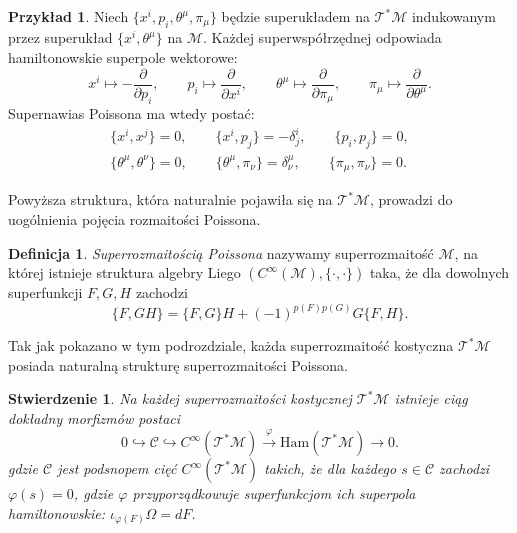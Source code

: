 \documentclass[11pt,a4paper]{report}
\newtheorem{proposition}[theorem]{Stwierdzenie}
\theoremstyle{definition}
\newtheorem{example}[theorem]{Przykład}
\newtheorem{definition}[theorem]{Definicja}
\begin{document}
\begin{example}
 Niech $\{ x^i, p_i, \theta^\mu, \pi_\mu \}$ będzie superukładem na $\mathcal{T^*M}$ indukowanym przez superukład $\{ x^i, \theta^\mu \}$ na $\mathcal{M}$. Każdej superwspółrzędnej odpowiada hamiltonowskie superpole wektorowe:
 \begin{equation*}
   x^i \mapsto -\frac{\partial}{\partial p_i}, \qquad p_i \mapsto \frac{\partial}{\partial x^i}, \qquad
   \theta^\mu \mapsto \frac{\partial}{\partial \pi_\mu}, \qquad \pi_\mu \mapsto \frac{\partial}{\partial \theta^\mu}.
 \end{equation*}
 Supernawias Poissona ma wtedy postać:
 \begin{equation*}
 \begin{gathered}
  \{x^i, x^j \} = 0, \qquad \{ x^i, p_j \} = - \delta^i_j, \qquad \{ p_i, p_j\} = 0, \\
  \{ \theta^\mu, \theta^\nu \} = 0, \qquad \{ \theta^\mu, \pi_\nu \} = \delta^\mu _\nu, \qquad \{ \pi_\mu, \pi_\nu \} = 0.
 \end{gathered}
 \end{equation*}
\end{example}

Powyższa struktura, która naturalnie pojawiła się na $\mathcal{T^*M}$, prowadzi do uogólnienia pojęcia rozmaitości Poissona.

\begin{definition}
 \textit{Superrozmaitością Poissona} nazywamy superrozmaitość $\mathcal{M}$, na której istnieje struktura algebry Liego $(C^\infty (\mathcal{M}), \{ \cdot, \cdot \})$ taka, że dla dowolnych superfunkcji $F,G,H$ zachodzi
 \begin{equation*}
  \{ F, GH \} = \{F,G\} H + (-1)^{p(F)p(G)} G \{ F,H\}.
 \end{equation*}
\end{definition}

Tak jak pokazano w tym podrozdziale, każda superrozmaitość kostyczna $\mathcal{T^*M}$ posiada naturalną strukturę superrozmaitości Poissona.

\begin{proposition}
 Na każdej superrozmaitości kostycznej $\mathcal{T^*M}$ istnieje ciąg dokładny morfizmów postaci
 \begin{equation*}
  0 \hookrightarrow \mathcal{C} \hookrightarrow C^\infty(\mathcal{T^*M}) \stackrel{\varphi}{\longrightarrow} \mathrm{Ham} (\mathcal{T^*M}) \rightarrow 0.
 \end{equation*}
 gdzie $\mathcal{C}$ jest podsnopem cięć $C^\infty (\mathcal{T^*M})$ takich, że dla każdego $s \in \mathcal{C}$ zachodzi $\varphi(s) = 0$, gdzie $\varphi$ przyporządkowuje superfunkcjom ich superpola hamiltonowskie: $\iota_{\varphi (F)} \Omega = dF$.
\end{proposition}
\end{document}
